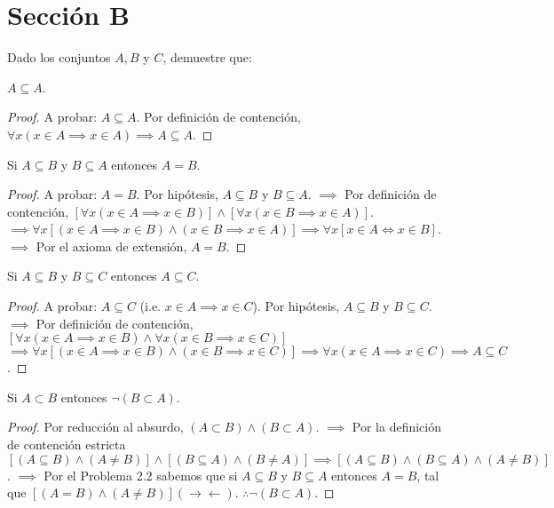 \section{Sección B }
Dado los conjuntos $A,B$ y $C$, demuestre que: 

\begin{problema}
	$A\subseteq A$.
\end{problema}

\begin{proof}
	A probar: $A\subseteq A$. Por definición de contención, $\forall x (x\in A\implies x\in A)\implies A\subseteq A$.
\end{proof}






\begin{problema}
	Si $A\subseteq B$ y $B\subseteq A$ entonces $A=B$.
\end{problema}
\begin{proof}
	A probar: $A=B$. Por hipótesis, $A\subseteq B$ y $B\subseteq A$. $\implies$ Por definición de contención, $[\forall x(x\in A \implies x\in B)]\wedge [\forall x(x\in B \implies x\in A)]$. $\implies 	\forall x[(x\in A \implies x\in B)\wedge (x\in B \implies x\in A)]\implies \forall x[x\in A\iff x\in B]$. $\implies$ Por el axioma de extensión,	$A=B$. 
\end{proof}




\begin{problema}
	Si $A\subseteq B$ y $B\subseteq C$ entonces $A\subseteq C$. 
\end{problema}
\begin{proof}
	A probar: $A\subseteq C$ (i.e. $x\in A\implies x\in C$). Por hipótesis, $A\subseteq B$ y $B\subseteq C$. $\implies$ Por definición de contención, $[\forall x(x\in A\implies x\in B)\wedge \forall x (x\in B \implies x\in C)]$ $\implies \forall x [(x\in A\implies x\in B)\wedge (x\in B \implies x\in C)]\implies \forall x(x\in A\implies x\in C)\implies A\subseteq C$.
\end{proof}



\begin{problema}
	Si  $A\subset B$ entonces $\neg(B\subset A)$.
\end{problema}

\begin{proof}
	Por reducción al absurdo, $(A\subset B)\wedge (B\subset A)$. $\implies$ Por la definición de contención estricta $[(A\subseteq B)\wedge (A\neq B)]\wedge [(B\subseteq A)\wedge (B\neq A)]\implies [(A\subseteq B)\wedge (B\subseteq A)\wedge (A\neq B)]$. $\implies$ Por el Problema 2.2 sabemos que si $A\subseteq B$ y $B\subseteq A$ entonces $A=B$, tal que $[(A=B)\wedge (A\neq B)] (\to\gets)$. $\therefore  \neg(B\subset A)$. 
\end{proof}

